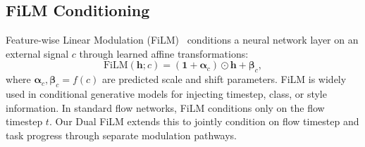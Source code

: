\subsection{FiLM Conditioning}
\label{sec:film}

Feature-wise Linear Modulation (FiLM)~\cite{perez2018film} conditions a neural network layer on an external signal $c$ through learned affine transformations:
\begin{equation}
    \text{FiLM}(\bm{h}; c) = (\bm{1} + \bm{\alpha}_c) \odot \bm{h} + \bm{\beta}_c,
    \label{eq:film}
\end{equation}
where $\bm{\alpha}_c, \bm{\beta}_c = f(c)$ are predicted scale and shift parameters. FiLM is widely used in conditional generative models for injecting timestep, class, or style information. In standard flow networks, FiLM conditions only on the flow timestep $t$. Our Dual FiLM extends this to jointly condition on flow timestep and task progress through separate modulation pathways.
